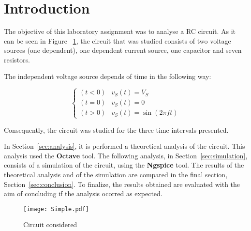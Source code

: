 \section{Introduction}
\label{sec:introduction}

The objective of this laboratory assignment was to analyse a RC circuit. As it can be seen in Figure ~\ref{circuit}, the circuit that was studied consists of two voltage sources (one dependent), one dependent current source, one capacitor and seven resistors.

The independent voltage source depends of time in the following way:

\begin{equation}
  \begin{cases}
    (t < 0) & v_S(t) = V_S \\
    (t = 0) & v_S(t) = 0 \\
    (t > 0) & v_S(t) = \sin(2\pi ft)
  \end{cases}
\end{equation}

Consequently, the circuit was studied for the three time intervals presented.

In Section~\ref{sec:analysis}, it is performed a theoretical analysis of the circuit. This analysis used the {\bf Octave} tool. The following analysis, in Section~\ref{sec:simulation}, consists of a simulation of the circuit, using the {\bf Ngspice} tool. The results of the theoretical analysis and of the simulation are compared in the final section, Section~\ref{sec:conclusion}. To finalize, the results obtained are evaluated with the aim of concluding if the analysis ocorred as expected.




\begin{figure}[H]
  \centering
  \texttt{[image: Simple.pdf]}
  \caption{Circuit considered}
  \label{circuit}
\end{figure}

